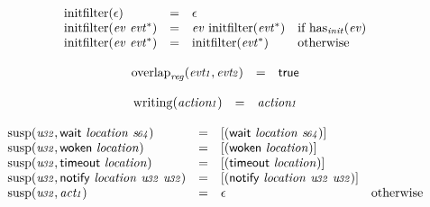 $$
\begin{array}[t]{@{}lcl@{}l@{}}
{\mathrm{initfilter}}(\epsilon) & = & \epsilon \\
{\mathrm{initfilter}}({\mathit{ev}}~{{\mathit{evt}}^\ast}) & = & {\mathit{ev}}~{\mathrm{initfilter}}({{\mathit{evt}}^\ast}) & \quad \mbox{if}~ {\mathrm{has}}_{\mathit{init}}({\mathit{ev}}) \\
{\mathrm{initfilter}}({\mathit{ev}}~{{\mathit{evt}}^\ast}) & = & {\mathrm{initfilter}}({{\mathit{evt}}^\ast}) & \quad \mbox{otherwise} \\
\end{array}
$$

$$
\begin{array}[t]{@{}lcl@{}l@{}}
{\mathrm{overlap}}_{\mathit{reg}}({\mathit{evt{\kern-0.1em\scriptstyle 1}}}, {\mathit{evt{\kern-0.1em\scriptstyle 2}}}) & = & \mathsf{true} \\
\end{array}
$$

$$
\begin{array}[t]{@{}lcl@{}l@{}}
{\mathrm{writing}}({\mathit{action{\kern-0.1em\scriptstyle 1}}}) & = & {\mathit{action{\kern-0.1em\scriptstyle 1}}} \\
\end{array}
$$

$$
\begin{array}[t]{@{}lcl@{}l@{}}
{\mathrm{susp}}({\mathit{u{\kern-0.1em\scriptstyle 32}}}, \mathsf{wait}~{\mathit{location}}~{\mathit{s{\kern-0.1em\scriptstyle 64}}}) & = & {}[(\mathsf{wait}~{\mathit{location}}~{\mathit{s{\kern-0.1em\scriptstyle 64}}})] \\
{\mathrm{susp}}({\mathit{u{\kern-0.1em\scriptstyle 32}}}, \mathsf{woken}~{\mathit{location}}) & = & {}[(\mathsf{woken}~{\mathit{location}})] \\
{\mathrm{susp}}({\mathit{u{\kern-0.1em\scriptstyle 32}}}, \mathsf{timeout}~{\mathit{location}}) & = & {}[(\mathsf{timeout}~{\mathit{location}})] \\
{\mathrm{susp}}({\mathit{u{\kern-0.1em\scriptstyle 32}}}, \mathsf{notify}~{\mathit{location}}~{\mathit{u{\kern-0.1em\scriptstyle 32}}}~{\mathit{u{\kern-0.1em\scriptstyle 32}}}) & = & {}[(\mathsf{notify}~{\mathit{location}}~{\mathit{u{\kern-0.1em\scriptstyle 32}}}~{\mathit{u{\kern-0.1em\scriptstyle 32}}})] \\
{\mathrm{susp}}({\mathit{u{\kern-0.1em\scriptstyle 32}}}, {\mathit{act{\kern-0.1em\scriptstyle 1}}}) & = & \epsilon & \quad \mbox{otherwise} \\
\end{array}
$$

